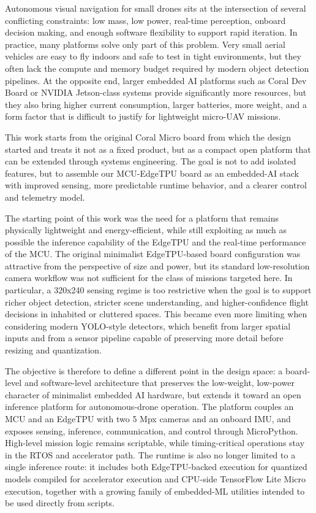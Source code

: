 Autonomous visual navigation for small drones sits at the intersection
of several conflicting constraints: low mass, low power, real-time
perception, onboard decision making, and enough software flexibility to
support rapid iteration. In practice, many platforms solve only part of
this problem. Very small aerial vehicles are easy to fly indoors and
safe to test in tight environments, but they often lack the compute and
memory budget required by modern object detection pipelines. At the
opposite end, larger embedded AI platforms such as Coral Dev Board or
NVIDIA Jetson-class systems provide significantly more resources, but
they also bring higher current consumption, larger batteries, more
weight, and a form factor that is difficult to justify for lightweight
micro-UAV missions.

This work starts from the original Coral Micro board from which the
design started and treats it not as a fixed product, but as a compact
open platform that can be extended through systems engineering. The goal
is not to add isolated features, but to assemble our MCU-EdgeTPU board
as an embedded-AI stack with improved sensing, more predictable runtime
behavior, and a clearer control and telemetry model.

The starting point of this work was the need for a platform that remains
physically lightweight and energy-efficient, while still exploiting as
much as possible the inference capability of the EdgeTPU and the
real-time performance of the MCU. The original minimalist EdgeTPU-based
board configuration was attractive from the perspective of size and
power, but its standard low-resolution camera workflow was not
sufficient for the class of missions targeted here. In particular, a
320x240 sensing regime is too restrictive when the goal is to support
richer object detection, stricter scene understanding, and
higher-confidence flight decisions in inhabited or cluttered spaces.
This became even more limiting when considering modern YOLO-style
detectors, which benefit from larger spatial inputs and from a sensor
pipeline capable of preserving more detail before resizing and
quantization.

The objective is therefore to define a different point in the design
space: a board-level and software-level architecture that preserves the
low-weight, low-power character of minimalist embedded AI hardware, but
extends it toward an open inference platform for autonomous-drone
operation. The platform couples an MCU and an EdgeTPU with two 5 Mpx
cameras and an onboard IMU, and exposes sensing, inference,
communication, and control through MicroPython. High-level mission logic
remains scriptable, while timing-critical operations stay in the RTOS
and accelerator path. The runtime is also no longer limited to a single
inference route: it includes both EdgeTPU-backed execution for quantized
models compiled for accelerator execution and CPU-side TensorFlow Lite
Micro execution, together with a growing family of embedded-ML utilities
intended to be used directly from scripts.

